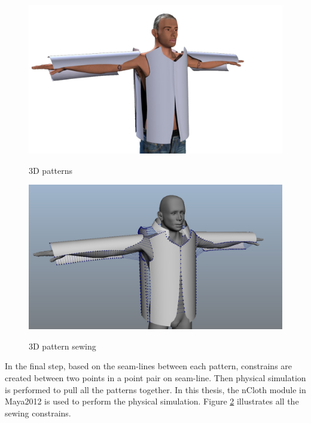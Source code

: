 \begin{figure}[H]
	\centering
	\includegraphics[width=1.0\columnwidth]{../images/normal_patterns}\\[0.1cm]
    \caption{3D patterns}
    \label{figure:normal_patterns}
\end{figure}

\begin{figure}[H]
	\centering
	\includegraphics[width=1.0\columnwidth]{../images/sewing}\\[0.1cm]
    \caption{3D pattern sewing}
    \label{figure:sewing_constrains}
\end{figure}


In the final step, based on the seam-lines between each pattern, constrains are created between two points in a point pair on seam-line. Then physical simulation is performed to pull all the patterns together. In this thesis, the nCloth module in Maya2012  is used to perform the physical simulation. Figure \ref{figure:sewing_constrains} illustrates all the sewing constrains. 
 
